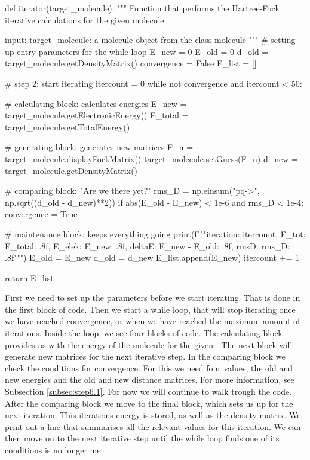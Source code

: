 \begin{python}[caption={iteration sequence},label={ls:Listing 6}]
    def iterator(target_molecule):
        """
        Function that performs the Hartree-Fock iterative calculations 
        for the given molecule.
        
        input:
        target_molecule: a molecule object from the class molecule
        """
        # setting up entry parameters for the while loop
        E_new = 0  
        E_old = 0
        d_old = target_molecule.getDensityMatrix()
        convergence = False
        E_list = []

        # step 2: start iterating
        itercount = 0
        while not convergence and itercount < 50:

            # calculating block: calculates energies
            E_new = target_molecule.getElectronicEnergy()
            E_total = target_molecule.getTotalEnergy()

            # generating block: generates new matrices
            F_n =  target_molecule.displayFockMatrix()
            target_molecule.setGuess(F_n)
            d_new = target_molecule.getDensityMatrix()

            # comparing block: "Are we there yet?"
            rms_D = np.einsum("pq->", np.sqrt((d_old - d_new)**2))
            if abs(E_old - E_new) < 1e-6 and rms_D < 1e-4:
                convergence = True


            # maintenance block: keeps everything going
            print(f"""iteration: {itercount}, E_tot: {E_total: .8f}, 
                        E_elek: {E_new: .8f}, 
                        deltaE: {E_new - E_old: .8f}, 
                        rmsD: {rms_D: .8f}""")
            E_old = E_new
            d_old = d_new
            E_list.append(E_new)
            itercount += 1
        
        return E_list
\end{python}

First we need to set up the parameters before we start iterating. That is done in 
the first block of code. Then we start a while loop, that will stop iterating once
we have reached convergence, or when we have reached the maximum amount of 
iterations. Inside the loop, we see four blocks of code. The calculating block 
provides us with the energy of the molecule for the given 
. The next block will generate new matrices for 
the next iterative step. In the comparing block we check the conditions for 
convergence. For this we need four values, the old and new energies and the old 
and new distance matrices. For more information, see Subsection 
\ref{subsec:step6.1}. For now we will continue to walk trough the code. 
After the comparing block we move to the final block, which sets us up for the 
next iteration. This iterations energy is stored, as well as the density matrix. 
We print out a line that summarises all the relevant values for this iteration. 
We can then move on to the next iterative step until the while loop finds one of 
its conditions is no longer met.

